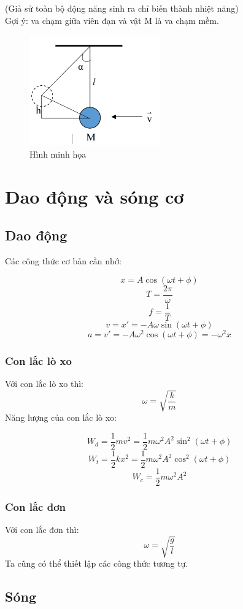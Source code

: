 (Giả sử toàn bộ động năng sinh ra chỉ biến thành nhiệt năng)
\\Gợi ý: va chạm giữa viên đạn và vật M là va chạm mềm.
\begin{figure}
    \centering
    \includegraphics[width=0.5\textwidth]{dan.png}
    \caption{Hình minh họa}
    \label{dan}
\end{figure}
\section{Dao động và sóng cơ}
\subsection{Dao động}
Các công thức cơ bản cần nhớ:
\begin{tcolorbox}
    $$x=A\cos{(\omega t+\phi)}$$
    $$T=\frac{2\pi}{\omega}$$
    $$f=\frac{1}{T}$$
    $$v=x'=-A\omega\sin{(\omega t+\phi)}$$
    $$a=v'=-A\omega^2\cos{(\omega t+\phi)}=-\omega^2x$$
\end{tcolorbox}
\subsubsection{Con lắc lò xo}
Với con lắc lò xo thì:$$\omega=\sqrt{\frac{k}{m}}$$
Năng lượng của con lắc lò xo:
\begin{tcolorbox}
    $$W_{d}=\frac{1}{2}mv^2=\frac{1}{2}m\omega^2A^2\sin^2{(\omega t+\phi)}$$
    $$W_{t}=\frac{1}{2}kx^2=\frac{1}{2}m\omega^2A^2\cos^2{(\omega t+\phi)}$$
    $$W_{c}=\frac{1}{2}m\omega^2A^2$$
\end{tcolorbox}
\subsubsection{Con lắc đơn}
Với con lắc đơn thì: $$\omega=\sqrt{\frac{g}{l}}$$
Ta cũng có thể thiết lập các công thức tương tự.
\subsection{Sóng}
